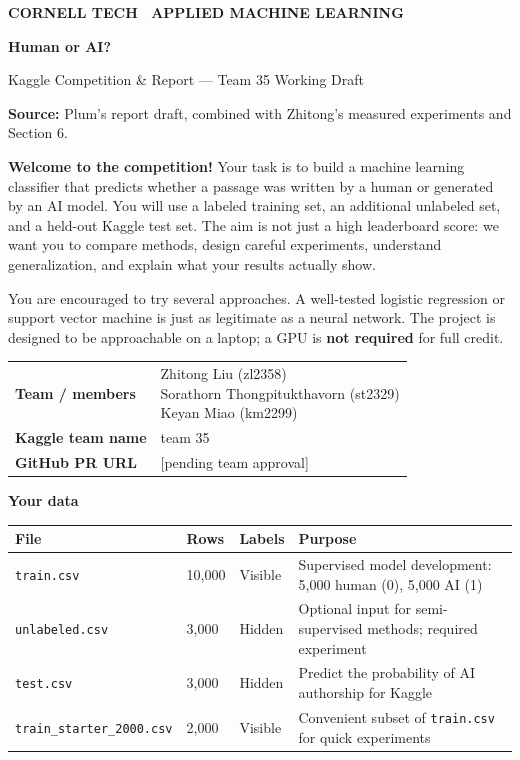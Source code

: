 \documentclass[11pt,letterpaper]{article}
\begin{document}
\thispagestyle{empty}

{\small\textbf{CORNELL TECH \textbar\ APPLIED MACHINE LEARNING}}
\vspace{4pt}

{\LARGE\textbf{Human or AI?}}
\vspace{2pt}

{\large Kaggle Competition \& Report --- Team 35 Working Draft}
\vspace{4pt}

\textbf{Source:} Plum's report draft, combined with Zhitong's measured experiments and Section 6.
\vspace{10pt}

\textbf{Welcome to the competition!} Your task is to build a machine learning classifier that predicts whether a passage was written by a human or generated by an AI model. You will use a labeled training set, an additional unlabeled set, and a held-out Kaggle test set. The aim is not just a high leaderboard score: we want you to compare methods, design careful experiments, understand generalization, and explain what your results actually show.

You are encouraged to try several approaches. A well-tested logistic regression or support vector machine is just as legitimate as a neural network. The project is designed to be approachable on a laptop; a GPU is \textbf{not required} for full credit.

\vspace{8pt}
\begin{tabular}{@{}ll@{}}
\textbf{Team / members} & \shortstack[l]{Zhitong Liu (zl2358) \\ Sorathorn Thongpitukthavorn (st2329) \\ Keyan Miao (km2299)} \\[3pt]
\textbf{Kaggle team name} & team 35 \\[3pt]
\textbf{GitHub PR URL} & [pending team approval] \\
\end{tabular}

\vspace{10pt}
{\large\textbf{Your data}}
\vspace{4pt}

\begin{tabularx}{\textwidth}{@{}llp{1.8cm}X@{}}
\toprule
\textbf{File} & \textbf{Rows} & \textbf{Labels} & \textbf{Purpose} \\
\midrule
\texttt{train.csv} & 10,000 & Visible & Supervised model development: 5,000 human (0), 5,000 AI (1) \\
\texttt{unlabeled.csv} & 3,000 & Hidden & Optional input for semi-supervised methods; required experiment \\
\texttt{test.csv} & 3,000 & Hidden & Predict the probability of AI authorship for Kaggle \\
\texttt{train\_starter\_2000.csv} & 2,000 & Visible & Convenient subset of \texttt{train.csv} for quick experiments \\
\bottomrule
\end{tabularx}
\end{document}
